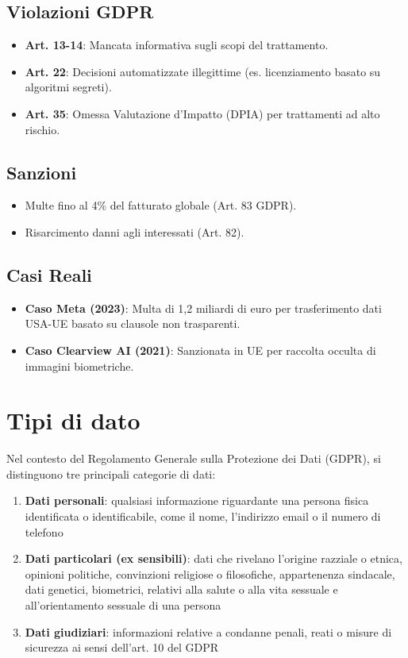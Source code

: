 \documentclass[8pt,oneside,a4paper]{article}
\begin{document}
	\subsection{Violazioni GDPR}  
	\begin{itemize}  
		\item \textbf{Art. 13-14}: Mancata informativa sugli scopi del trattamento.  
		\item \textbf{Art. 22}: Decisioni automatizzate illegittime (es. licenziamento basato su algoritmi segreti).  
		\item \textbf{Art. 35}: Omessa Valutazione d’Impatto (DPIA) per trattamenti ad alto rischio.  
	\end{itemize}  
	\subsection{Sanzioni}  
	\begin{itemize}  
		\item Multe fino al 4\% del fatturato globale (Art. 83 GDPR).  
		\item Risarcimento danni agli interessati (Art. 82).  
	\end{itemize}  
	\subsection{Casi Reali}  
	\begin{itemize}  
		\item \textbf{Caso Meta (2023)}: Multa di 1,2 miliardi di euro per trasferimento dati USA-UE basato su clausole non trasparenti.  
		\item \textbf{Caso Clearview AI (2021)}: Sanzionata in UE per raccolta occulta di immagini biometriche.  
	\end{itemize}  
	\section{Tipi di dato}
	Nel contesto del Regolamento Generale sulla Protezione dei Dati (GDPR), si distinguono tre principali categorie di dati:
	\begin{enumerate}
		\item \textbf{Dati personali}: qualsiasi informazione riguardante una persona fisica identificata o identificabile, come il nome, l'indirizzo email o il numero di telefono
		\item \textbf{Dati particolari (ex sensibili)}: dati che rivelano l'origine razziale o etnica, opinioni politiche, convinzioni religiose o filosofiche, appartenenza sindacale, dati genetici, biometrici, relativi alla salute o alla vita sessuale e all'orientamento sessuale di una persona
		\item \textbf{Dati giudiziari}: informazioni relative a condanne penali, reati o misure di sicurezza ai sensi dell'art. 10 del GDPR
	\end{enumerate}
\end{document}
